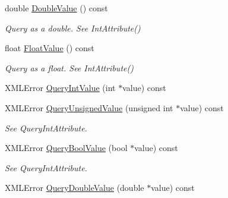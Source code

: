 \begin{DoxyCompactItemize}
\mbox{\label{classtinyxml2_1_1XMLAttribute_a4aa73513f54ff0087d3e804f0f54e30f}} 
double \hyperlink{classtinyxml2_1_1XMLAttribute_a4aa73513f54ff0087d3e804f0f54e30f}{Double\+Value} () const
\begin{DoxyCompactList}\small\item\em Query as a double. See Int\+Attribute() \end{DoxyCompactList}\item 
\mbox{\label{classtinyxml2_1_1XMLAttribute_a27797b45d21c981257720db94f5f8801}} 
float \hyperlink{classtinyxml2_1_1XMLAttribute_a27797b45d21c981257720db94f5f8801}{Float\+Value} () const
\begin{DoxyCompactList}\small\item\em Query as a float. See Int\+Attribute() \end{DoxyCompactList}\item 
X\+M\+L\+Error \hyperlink{classtinyxml2_1_1XMLAttribute_a6d5176260db00ea301c01af8457cd993}{Query\+Int\+Value} (int $\ast$value) const
\item 
\mbox{\label{classtinyxml2_1_1XMLAttribute_a48a7f3496f1415832e451bd8d09c9cb9}} 
X\+M\+L\+Error \hyperlink{classtinyxml2_1_1XMLAttribute_a48a7f3496f1415832e451bd8d09c9cb9}{Query\+Unsigned\+Value} (unsigned int $\ast$value) const
\begin{DoxyCompactList}\small\item\em See Query\+Int\+Attribute. \end{DoxyCompactList}\item 
\mbox{\label{classtinyxml2_1_1XMLAttribute_a5f32e038954256f61c21ff20fd13a09c}} 
X\+M\+L\+Error \hyperlink{classtinyxml2_1_1XMLAttribute_a5f32e038954256f61c21ff20fd13a09c}{Query\+Bool\+Value} (bool $\ast$value) const
\begin{DoxyCompactList}\small\item\em See Query\+Int\+Attribute. \end{DoxyCompactList}\item 
\mbox{\label{classtinyxml2_1_1XMLAttribute_a2aa6e55e8ea03af0609cf6690bff79b9}} 
X\+M\+L\+Error \hyperlink{classtinyxml2_1_1XMLAttribute_a2aa6e55e8ea03af0609cf6690bff79b9}{Query\+Double\+Value} (double $\ast$value) const

\end{DoxyCompactItemize}
